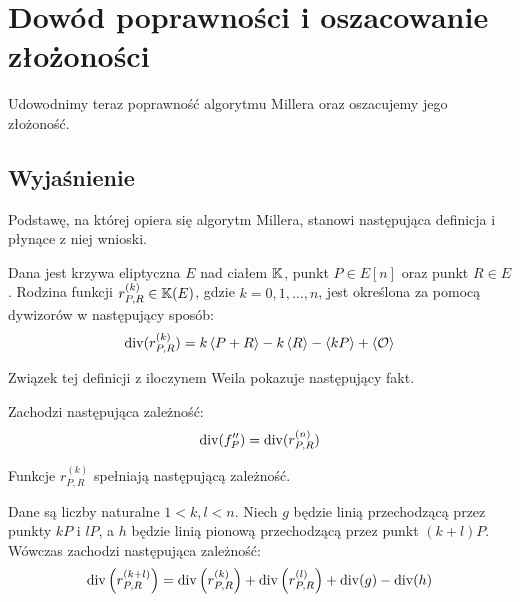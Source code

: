 \section{Dowód poprawności i oszacowanie złożoności}

\noindent
Udowodnimy teraz poprawność algorytmu Millera
oraz oszacujemy jego złożoność.

\subsection*{Wyjaśnienie}

\noindent
Podstawę, na której opiera się algorytm Millera,
stanowi następująca definicja i płynące z niej wnioski.

\begin{definition}
Dana jest krzywa eliptyczna $E$ nad ciałem $\mathbb{K}$,
punkt $P \in E[n]$ oraz punkt $R \in E$.
Rodzina funkcji $r_{P,R}^{(k)} \in \mathbb{K}(E)$, gdzie $k = 0, 1, \ldots, n$,
jest określona za pomocą dywizorów
w następujący sposób:
\begin{equation}
\operatorname{div}(r_{P,R}^{(k)}) = k\left\langle P+R\right\rangle - k\left\langle R\right\rangle - \left\langle kP\right\rangle + \left\langle\mathcal{O}\right\rangle
\end{equation}
\end{definition}

\noindent
Związek tej definicji z iloczynem Weila pokazuje następujący fakt.

\begin{fact}\label{rn_eq_fp_fact}
Zachodzi następująca zależność:
\begin{equation}
\operatorname{div}(f_P'') = \operatorname{div}(r_{P,R}^{(n)})
\end{equation}
\end{fact}

\noindent
Funkcje $r_{P,R}^{(k)}$ spełniają następującą zależność.

\begin{lemma}\label{dbl_add_lemma}
Dane są liczby naturalne $1 < k,l < n$.
Niech $g$ będzie linią przechodzącą przez punkty $kP$ i $lP$,
a $h$ będzie linią pionową przechodzącą przez punkt $(k+l)P$.
Wówczas zachodzi następująca zależność:
\begin{equation}
\operatorname{div}\left(r_{P,R}^{(k+l)}\right) =
\operatorname{div}\left(r_{P,R}^{(k)}\right) + \operatorname{div}\left(r_{P,R}^{(l)}\right) +
\operatorname{div}(g) - \operatorname{div}(h)
\end{equation}
\end{lemma}

